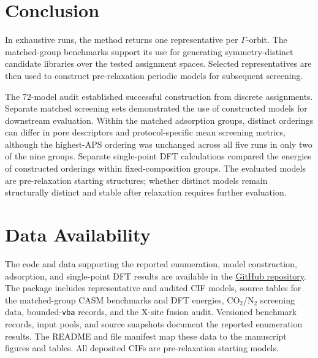 \documentclass[a5paper, 10pt]{article}
\begin{document}
\section{Conclusion}
\label{sec:discussion}
In exhaustive runs, the method returns one representative per $\Gamma$-orbit. The matched-group benchmarks support its use for generating symmetry-distinct candidate libraries over the tested assignment spaces. Selected representatives are then used to construct pre-relaxation periodic models for subsequent screening.

The 72-model audit established successful construction from discrete assignments. Separate matched screening sets demonstrated the use of constructed models for downstream evaluation. Within the matched adsorption groups, distinct orderings can differ in pore descriptors and protocol-specific mean screening metrics, although the highest-APS ordering was unchanged across all five runs in only two of the nine groups. Separate single-point DFT calculations compared the energies of constructed orderings within fixed-composition groups. The evaluated models are pre-relaxation starting structures; whether distinct models remain structurally distinct and stable after relaxation requires further evaluation.

\section*{Data Availability}
\label{sec:data}
The code and data supporting the reported enumeration, model construction, adsorption, and single-point DFT results are available in the \href{https://github.com/Buct454/mof-enumeration-reconstruction.git}{GitHub repository}. The package includes representative and audited CIF models, source tables for the matched-group CASM benchmarks and DFT energies, CO$_2$/N$_2$ screening data, bounded-\texttt{vba} records, and the X-site fusion audit. Versioned benchmark records, input pools, and source snapshots document the reported enumeration results. The README and file manifest map these data to the manuscript figures and tables. All deposited CIFs are pre-relaxation starting models.
\end{document}
